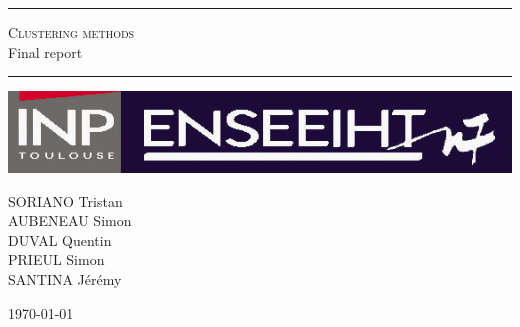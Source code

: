 \begin{titlepage}
\begin{center}



\vspace{1.0cm}
\hrule
\vspace{0.5cm}
\textsc{\large Clustering methods}\\
\huge{Final report\\}
\vspace{0.3cm}
\hrule
\vspace{2em}

\vspace{1.5em}
\includegraphics[scale=0.5]{Image/logo.jpg}

\vspace{2.5cm}
\begin{minipage}{1.0\textwidth}
\begin{center}
\large{
SORIANO Tristan\\
AUBENEAU Simon\\
DUVAL Quentin\\
PRIEUL Simon\\
SANTINA Jérémy
}
\end{center}
\end{minipage}

\vfill
\large{\today}

\end{center}
\end{titlepage}
